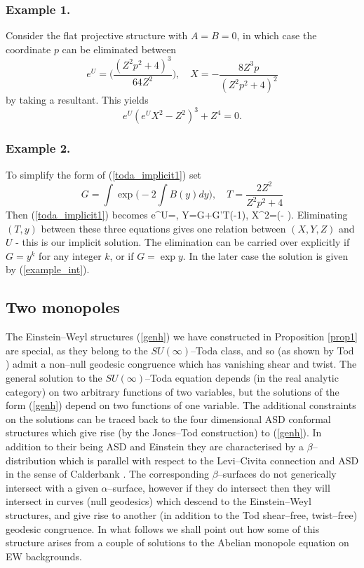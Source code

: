 \subsubsection{Example 1.}
Consider the flat projective structure with $A=B=0$, in which case
the coordinate $p$ can be eliminated between
\[
e^U=\bigg(\frac{(Z^2p^2+4)^3}{64Z^2}\bigg), \quad
X=-\frac{8Z^3p}{(Z^2p^2+4)^2}
\]
by taking a resultant. This yields
\[
e^U(e^UX^2-Z^2)^3+Z^4=0.
\]
\subsubsection{Example 2.}
To simplify the form of (\ref{toda_implicit1}) set
\[
G=\int\exp{\Big(-2\int B(y)dy\Big)}, \quad T=\frac{2Z^2}{Z^2p^2+4}
\]
Then (\ref{toda_implicit1}) becomes
\be
\label{toda_impl2}
e^U=, \quad Y=G+G'T\Big(-1\Big), \quad
X^2=\Big(- \Big).
\ee
Eliminating $(T, y)$ between these three equations gives one relation between $(X, Y, Z)$ and  $U$ - this is our implicit solution.
The elimination can be carried over explicitly if $G=y^k$ for any integer $k$, or if $G=\exp{y}$. In the later case the solution is given by
(\ref{example_int}).
\subsection{Two monopoles}
The Einstein--Weyl structures  (\ref{genh}) we have constructed in Proposition \ref{prop1}
are special, as they belong to the $SU(\infty)$--Toda class, and so
(as shown by Tod \cite{Tod_toda}) admit a non--null geodesic congruence which has vanishing shear and twist.
The general solution to the $SU(\infty)$--Toda equation depends (in the real analytic category) on 
two arbitrary functions of two variables, but the solutions of the form (\ref{genh}) depend on two functions of one variable. The additional constraints on the solutions can be traced back to the four dimensional ASD conformal structures
which give rise (by the Jones--Tod construction) to (\ref{genh}). In addition to their being ASD and Einstein
they are  characterised \cite{DM} by a $\beta$--distribution which is parallel with respect to the Levi--Civita connection and ASD in the sense of Calderbank \cite{Cal1}.
The corresponding $\beta$--surfaces do not generically intersect with a given $\alpha$--surface, however if they do intersect then they will intersect in curves (null geodesics) which descend to the Einstein--Weyl structures, and give
rise to another (in addition to the Tod shear--free, twist--free) geodesic congruence.
In what follows we shall point out how some of this structure arises from a couple of solutions to the Abelian monopole
equation on EW  backgrounds.

